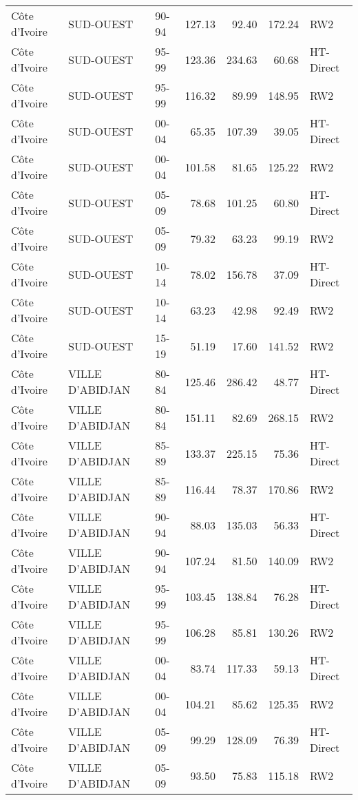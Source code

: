 \begin{longtable}{lllrrrl}
  C\^{o}te d'Ivoire & SUD-OUEST & 90-94 & 127.13 & 92.40 & 172.24 & RW2 \\ 
  C\^{o}te d'Ivoire & SUD-OUEST & 95-99 & 123.36 & 234.63 & 60.68 & HT-Direct \\ 
  C\^{o}te d'Ivoire & SUD-OUEST & 95-99 & 116.32 & 89.99 & 148.95 & RW2 \\ 
  C\^{o}te d'Ivoire & SUD-OUEST & 00-04 & 65.35 & 107.39 & 39.05 & HT-Direct \\ 
  C\^{o}te d'Ivoire & SUD-OUEST & 00-04 & 101.58 & 81.65 & 125.22 & RW2 \\ 
  C\^{o}te d'Ivoire & SUD-OUEST & 05-09 & 78.68 & 101.25 & 60.80 & HT-Direct \\ 
  C\^{o}te d'Ivoire & SUD-OUEST & 05-09 & 79.32 & 63.23 & 99.19 & RW2 \\ 
  C\^{o}te d'Ivoire & SUD-OUEST & 10-14 & 78.02 & 156.78 & 37.09 & HT-Direct \\ 
  C\^{o}te d'Ivoire & SUD-OUEST & 10-14 & 63.23 & 42.98 & 92.49 & RW2 \\ 
  C\^{o}te d'Ivoire & SUD-OUEST & 15-19 & 51.19 & 17.60 & 141.52 & RW2 \\ 
  C\^{o}te d'Ivoire & VILLE D'ABIDJAN & 80-84 & 125.46 & 286.42 & 48.77 & HT-Direct \\ 
  C\^{o}te d'Ivoire & VILLE D'ABIDJAN & 80-84 & 151.11 & 82.69 & 268.15 & RW2 \\ 
  C\^{o}te d'Ivoire & VILLE D'ABIDJAN & 85-89 & 133.37 & 225.15 & 75.36 & HT-Direct \\ 
  C\^{o}te d'Ivoire & VILLE D'ABIDJAN & 85-89 & 116.44 & 78.37 & 170.86 & RW2 \\ 
  C\^{o}te d'Ivoire & VILLE D'ABIDJAN & 90-94 & 88.03 & 135.03 & 56.33 & HT-Direct \\ 
  C\^{o}te d'Ivoire & VILLE D'ABIDJAN & 90-94 & 107.24 & 81.50 & 140.09 & RW2 \\ 
  C\^{o}te d'Ivoire & VILLE D'ABIDJAN & 95-99 & 103.45 & 138.84 & 76.28 & HT-Direct \\ 
  C\^{o}te d'Ivoire & VILLE D'ABIDJAN & 95-99 & 106.28 & 85.81 & 130.26 & RW2 \\ 
  C\^{o}te d'Ivoire & VILLE D'ABIDJAN & 00-04 & 83.74 & 117.33 & 59.13 & HT-Direct \\ 
  C\^{o}te d'Ivoire & VILLE D'ABIDJAN & 00-04 & 104.21 & 85.62 & 125.35 & RW2 \\ 
  C\^{o}te d'Ivoire & VILLE D'ABIDJAN & 05-09 & 99.29 & 128.09 & 76.39 & HT-Direct \\ 
  C\^{o}te d'Ivoire & VILLE D'ABIDJAN & 05-09 & 93.50 & 75.83 & 115.18 & RW2 \\ 

\end{longtable}
